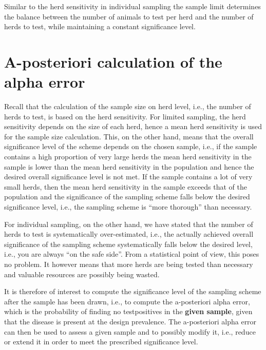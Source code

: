 \documentclass[nojss]{jss}
\begin{document}
Similar to the herd sensitivity in individual sampling the sample limit determines the balance between the number of animals to test per herd and the number of herds to test, while maintaining a constant  significance level.



\section{A-posteriori calculation of the alpha error} \label{sec:aposteriori}

Recall that the calculation of the sample size on herd level, i.e., the number of herds to test, is based on the herd sensitivity. For limited sampling, the herd sensitivity depends on the size of each herd, hence a mean herd sensitivity is used for the sample size calculation. This, on the other hand, means that the overall significance level of the scheme depends on the chosen sample, i.e., if the sample contains a high proportion of very large herds the mean herd sensitivity in the sample is lower than the mean herd sensitivity in the population and hence the desired overall significance level is not met. If the sample contains a lot of very small herds, then the mean herd sensitivity in the sample exceeds that of the population and the significance of the sampling scheme falls below the desired significance level, i.e., the sampling scheme is ``more thorough'' than necessary.

For individual sampling, on the other hand, we have stated that the number of herds to test is systematically over-estimated, i.e., the actually achieved overall significance of the sampling scheme systematically falls below the desired level, i.e., you are always ``on the safe side''. From a statistical point of view, this poses no problem. It however means that more herds are being tested than necessary and valuable resources are possibly being wasted.

It is therefore of interest to compute the significance level of the sampling scheme after the sample has been drawn, i.e., to compute the  a-posteriori alpha error, which is the probability of finding no testpositives in the \textbf{given sample}, given that the disease is present at the design prevalence. The a-posteriori alpha error can then be used to assess a given sample and to possibly modify it, i.e., reduce or extend it in order to meet the prescribed significance level.
\end{document}
